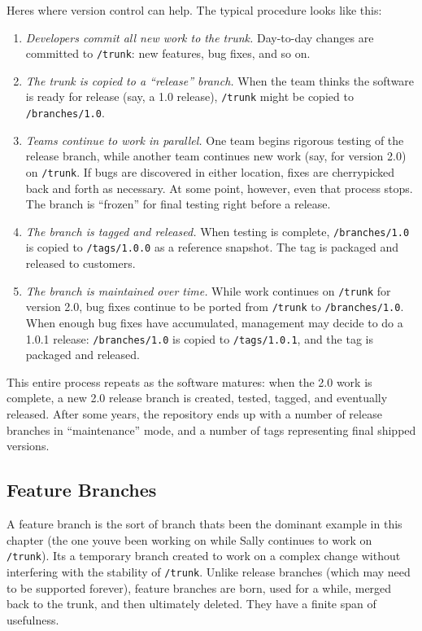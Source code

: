 Here\textquotesingle s where version control can help. The typical
procedure looks like this:

\begin{enumerate}
\def\labelenumi{\arabic{enumi}.}
\item
  \emph{Developers commit all new work to the trunk.} Day-to-day changes
  are committed to \texttt{/trunk}: new features, bug fixes, and so on.
\item
  \emph{The trunk is copied to a ``release'' branch.} When the team
  thinks the software is ready for release (say, a 1.0 release),
  \texttt{/trunk} might be copied to \texttt{/branches/1.0}.
\item
  \emph{Teams continue to work in parallel.} One team begins rigorous
  testing of the release branch, while another team continues new work
  (say, for version 2.0) on \texttt{/trunk}. If bugs are discovered in
  either location, fixes are cherrypicked back and forth as necessary.
  At some point, however, even that process stops. The branch is
  ``frozen'' for final testing right before a release.
\item
  \emph{The branch is tagged and released.} When testing is complete,
  \texttt{/branches/1.0} is copied to \texttt{/tags/1.0.0} as a
  reference snapshot. The tag is packaged and released to customers.
\item
  \emph{The branch is maintained over time.} While work continues on
  \texttt{/trunk} for version 2.0, bug fixes continue to be ported from
  \texttt{/trunk} to \texttt{/branches/1.0}. When enough bug fixes have
  accumulated, management may decide to do a 1.0.1 release:
  \texttt{/branches/1.0} is copied to \texttt{/tags/1.0.1}, and the tag
  is packaged and released.
\end{enumerate}

This entire process repeats as the software matures: when the 2.0 work
is complete, a new 2.0 release branch is created, tested, tagged, and
eventually released. After some years, the repository ends up with a
number of release branches in ``maintenance'' mode, and a number of tags
representing final shipped versions.

\subsection{Feature
Branches}\label{svn.branchmerge.commonpatterns.feature}

A feature branch is the sort of branch that\textquotesingle s been the
dominant example in this chapter (the one you\textquotesingle ve been
working on while Sally continues to work on \texttt{/trunk}).
It\textquotesingle s a temporary branch created to work on a complex
change without interfering with the stability of \texttt{/trunk}. Unlike
release branches (which may need to be supported forever), feature
branches are born, used for a while, merged back to the trunk, and then
ultimately deleted. They have a finite span of usefulness.


